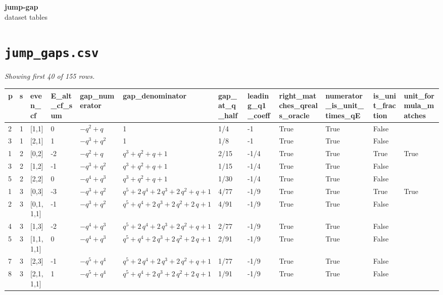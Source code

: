 \documentclass[10pt]{article}
\begin{document}
\begin{center}\Large\textbf{jump-gap} \\ \normalsize dataset tables\end{center}
\vspace{1em}
\section*{\texttt{jump\_gaps.csv}}
\noindent\textit{Showing first 40 of 155 rows.}\par\medskip
{\footnotesize
\begin{longtable}{@{}llllllllllll@{}}
\toprule
\textbf{p} & \textbf{s} & \textbf{even\_cf} & \textbf{E\_alt\_cf\_sum} & \textbf{gap\_numerator} & \textbf{gap\_denominator} & \textbf{gap\_at\_q\_half} & \textbf{leading\_q1\_coeff} & \textbf{right\_matches\_qreals\_oracle} & \textbf{numerator\_is\_unit\_times\_qE} & \textbf{is\_unit\_fraction} & \textbf{unit\_formula\_matches} \\
\midrule\endhead
2 & 1 & [1,1] & 0 & $-q^{2} + q$ & 1 & 1/4 & -1 & True & True & False &  \\
3 & 1 & [2,1] & 1 & $-q^{3} + q^{2}$ & 1 & 1/8 & -1 & True & True & False &  \\
1 & 2 & [0,2] & -2 & $-q^{2} + q$ & $q^{3} + q^{2} + q + 1$ & 2/15 & -1/4 & True & True & True & True \\
3 & 2 & [1,2] & -1 & $-q^{3} + q^{2}$ & $q^{3} + q^{2} + q + 1$ & 1/15 & -1/4 & True & True & False &  \\
5 & 2 & [2,2] & 0 & $-q^{4} + q^{3}$ & $q^{3} + q^{2} + q + 1$ & 1/30 & -1/4 & True & True & False &  \\
1 & 3 & [0,3] & -3 & $-q^{3} + q^{2}$ & $q^{5} + 2\,q^{4} + 2\,q^{3} + 2\,q^{2} + q + 1$ & 4/77 & -1/9 & True & True & True & True \\
2 & 3 & [0,1,1,1] & -1 & $-q^{3} + q^{2}$ & $q^{5} + q^{4} + 2\,q^{3} + 2\,q^{2} + 2\,q + 1$ & 4/91 & -1/9 & True & True & False &  \\
4 & 3 & [1,3] & -2 & $-q^{4} + q^{3}$ & $q^{5} + 2\,q^{4} + 2\,q^{3} + 2\,q^{2} + q + 1$ & 2/77 & -1/9 & True & True & False &  \\
5 & 3 & [1,1,1,1] & 0 & $-q^{4} + q^{3}$ & $q^{5} + q^{4} + 2\,q^{3} + 2\,q^{2} + 2\,q + 1$ & 2/91 & -1/9 & True & True & False &  \\
7 & 3 & [2,3] & -1 & $-q^{5} + q^{4}$ & $q^{5} + 2\,q^{4} + 2\,q^{3} + 2\,q^{2} + q + 1$ & 1/77 & -1/9 & True & True & False &  \\
8 & 3 & [2,1,1,1] & 1 & $-q^{5} + q^{4}$ & $q^{5} + q^{4} + 2\,q^{3} + 2\,q^{2} + 2\,q + 1$ & 1/91 & -1/9 & True & True & False &  \\

\end{longtable}}
\end{document}
